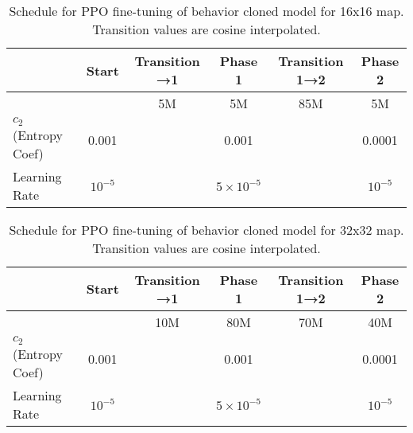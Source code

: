 \documentclass[conference,onecolumn]{IEEEtran}
\newcounter{supptable}
\newenvironment{supptable}
  {\renewcommand{\tablename}{Supplemental Table}\setcounter{table}{\value{supptable}}\addtocounter{supptable}{1}\begin{table}}
  {\end{table}\setcounter{supptable}{\value{table}}}
\begin{document}
\begin{supptable}[H]
    \caption{Schedule for PPO fine-tuning of behavior cloned model for 16x16 map. Transition values are cosine interpolated.}
    \label{tab:bc-ppo-schedule-map16}
    \begin{center}
    \begin{tabular}{lccccc}
    & Start & Transition →1 & Phase 1 & Transition 1→2 & Phase 2 \\
    \midrule
    &  & 5M & 5M & 85M & 5M \\
    $c_2$ (Entropy Coef) & 0.001 &  & 0.001 &  & 0.0001 \\
    Learning Rate & $10^{-5}$ &  & $5 \times 10^{-5}$ &  & $10^{-5}$ \\
    \end{tabular}
\end{center}
\end{supptable}

\begin{supptable}[H]
    \caption{Schedule for PPO fine-tuning of behavior cloned model for 32x32 map. Transition values are cosine interpolated.}
    \label{tab:bc-ppo-schedule-map32}
    \begin{center}
    \begin{tabular}{lccccc}
    & Start & Transition →1 & Phase 1 & Transition 1→2 & Phase 2 \\
    \midrule
    &  & 10M & 80M & 70M & 40M \\
    $c_2$ (Entropy Coef) & 0.001 &  & 0.001 &  & 0.0001 \\
    Learning Rate & $10^{-5}$ &  & $5 \times 10^{-5}$ &  & $10^{-5}$ \\
    \end{tabular}
\end{center}
\end{supptable}
\end{document}
